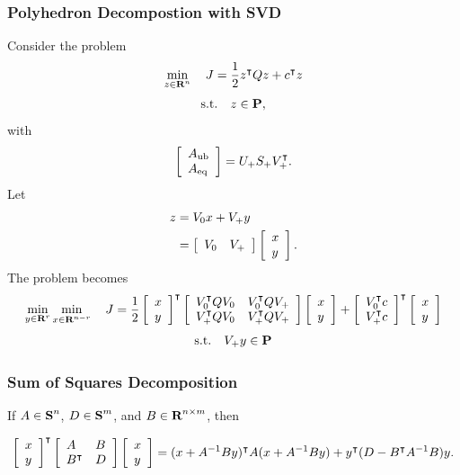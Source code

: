 \documentclass{article}
\begin{document}
    \subsubsection{Polyhedron Decompostion with SVD}
    Consider the problem
    \begin{align*}
        \min_{z\in\R^{n}}\quad J=\frac{1}{2}z^\tp Q z + c^\tp z
    \end{align*}
    \begin{align*}
        \st\quad z\in\poly,
    \end{align*}
    with
    \begin{align*}
        \mat{A_\ub\\A_\eq} = \lrs \psv \rrs^\tp.
    \end{align*}
    Let
    \begin{align*}
        z&=\rns x + \rrs y \\
        &= \mat{\rns & \rrs}\mat{x \\ y}.
    \end{align*}
    The problem becomes 
    \begin{align*}
        \min_{y\in\R^r}\min_{x\in\R^{n-r}}\quad J=
        \frac{1}{2}\mat{x \\ y}^\tp 
        \mat{\rns^\tp Q \rns & \rns^\tp Q \rrs \\ 
        \rrs^\tp Q \rns & \rrs^\tp Q \rrs} 
        \mat{x \\ y} 
        +  \mat{\rns^\tp c \\ \rrs^\tp c}^\tp\mat{x \\ y}
    \end{align*}
    \begin{align*}
        \st \quad\rrs y\in\poly
    \end{align*}
    
    \subsubsection{Sum of Squares Decomposition}
    
        If $A\in\sym^n$, $D\in\sym^m$, and $B\in\R^{n\times m}$, then
    
        \begin{align}
            \mat{x\\y}^\tp \mat{A & B \\ B^\tp & D}\mat{x\\y} =
            (x+A^{-1}By)^\tp A (x+A^{-1}By)+y^\tp(D-B^\tp A^{-1} B)y.
        \end{align}
    
\end{document}
